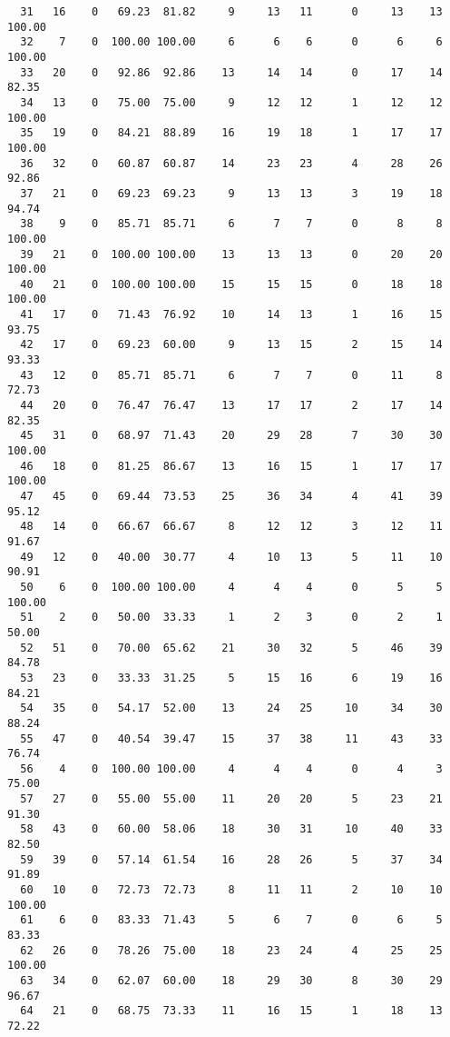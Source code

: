 \begin{verbatim}
  31   16    0   69.23  81.82     9     13   11      0     13    13   100.00
  32    7    0  100.00 100.00     6      6    6      0      6     6   100.00
  33   20    0   92.86  92.86    13     14   14      0     17    14    82.35
  34   13    0   75.00  75.00     9     12   12      1     12    12   100.00
  35   19    0   84.21  88.89    16     19   18      1     17    17   100.00
  36   32    0   60.87  60.87    14     23   23      4     28    26    92.86
  37   21    0   69.23  69.23     9     13   13      3     19    18    94.74
  38    9    0   85.71  85.71     6      7    7      0      8     8   100.00
  39   21    0  100.00 100.00    13     13   13      0     20    20   100.00
  40   21    0  100.00 100.00    15     15   15      0     18    18   100.00
  41   17    0   71.43  76.92    10     14   13      1     16    15    93.75
  42   17    0   69.23  60.00     9     13   15      2     15    14    93.33
  43   12    0   85.71  85.71     6      7    7      0     11     8    72.73
  44   20    0   76.47  76.47    13     17   17      2     17    14    82.35
  45   31    0   68.97  71.43    20     29   28      7     30    30   100.00
  46   18    0   81.25  86.67    13     16   15      1     17    17   100.00
  47   45    0   69.44  73.53    25     36   34      4     41    39    95.12
  48   14    0   66.67  66.67     8     12   12      3     12    11    91.67
  49   12    0   40.00  30.77     4     10   13      5     11    10    90.91
  50    6    0  100.00 100.00     4      4    4      0      5     5   100.00
  51    2    0   50.00  33.33     1      2    3      0      2     1    50.00
  52   51    0   70.00  65.62    21     30   32      5     46    39    84.78
  53   23    0   33.33  31.25     5     15   16      6     19    16    84.21
  54   35    0   54.17  52.00    13     24   25     10     34    30    88.24
  55   47    0   40.54  39.47    15     37   38     11     43    33    76.74
  56    4    0  100.00 100.00     4      4    4      0      4     3    75.00
  57   27    0   55.00  55.00    11     20   20      5     23    21    91.30
  58   43    0   60.00  58.06    18     30   31     10     40    33    82.50
  59   39    0   57.14  61.54    16     28   26      5     37    34    91.89
  60   10    0   72.73  72.73     8     11   11      2     10    10   100.00
  61    6    0   83.33  71.43     5      6    7      0      6     5    83.33
  62   26    0   78.26  75.00    18     23   24      4     25    25   100.00
  63   34    0   62.07  60.00    18     29   30      8     30    29    96.67
  64   21    0   68.75  73.33    11     16   15      1     18    13    72.22

\end{verbatim}
